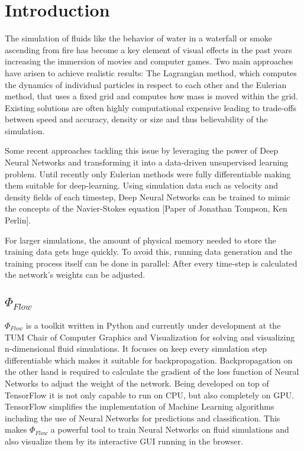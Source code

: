 \chapter{Introduction}\label{chapter:introduction}
The simulation of fluids like the behavior of water in a waterfall or smoke ascending from fire has become a key element of visual effects in the past years increasing the immersion of movies and computer games. Two main approaches have arisen to achieve realistic results: The Lagrangian method, which computes the dynamics of individual particles in respect to each other and the Eulerian method, that uses a fixed grid and computes how mass is moved within the grid. Existing solutions are often highly computational expensive leading to trade-offs between speed and accuracy, density or size and thus believability of the simulation.
\par Some recent approaches tackling this issue by leveraging the power of Deep Neural Networks and transforming it into a data-driven unsupervised learning problem. Until recently only Eulerian methods were fully differentiable making them suitable for deep-learning. Using simulation data such as velocity and density fields of each timestep, Deep Neural Networks can be trained to mimic the concepts of the Navier-Stokes equation [Paper of Jonathan Tompson, Ken Perlin].
\par For larger simulations, the amount of physical memory needed to store the training data gets huge quickly. To avoid this, running data generation and the training process itself can be done in parallel: After every time-step is calculated the network's weights can be adjusted.
\section{$\Phi_\textit{Flow}$ }
$\Phi_\textit{Flow}$ is a toolkit written in Python and currently under development at the TUM Chair of Computer Graphics and Visualization for solving and visualizing n-dimensional fluid simulations. It focuses on keep every simulation step differentiable which makes it suitable for backpropagation. Backpropagation on the other hand is required to calculate the gradient of the loss function of Neural Networks to adjust the weight of the network. Being developed on top of TensorFlow it is not only capable to run on CPU, but also completely on GPU. TensorFlow simplifies the implementation of Machine Learning algorithms including the use of Neural Networks for predictions and classification. This makes $\Phi_\textit{Flow}$ a powerful tool to train Neural Networks on fluid simulations and also visualize them by its interactive GUI running in the browser. 
